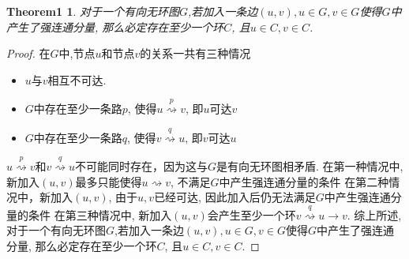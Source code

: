 \documentclass{article}
\newtheorem{theorem}{Theorem1}
\begin{document}
\begin{theorem}
    对于一个有向无环图$G$,若加入一条边$(u,v), u \in G, v \in G$使得$G$中产生了强连通分量, 那么必定存在至少一个环$C$, 且$u \in C, v \in C$.
\end{theorem}
\begin{proof} 
    在$G$中,节点$u$和节点$v$的关系一共有三种情况
    \begin{center}
        \begin{itemize}
            \item $u$与$v$相互不可达.
            \item $G$中存在至少一条路$p$, 使得$u \stackrel{p}{\rightsquigarrow} v$, 即$u$可达$v$
            \item $G$中存在至少一条路$q$, 使得$v \stackrel{q}{\rightsquigarrow} u$, 即$v$可达$u$
        \end{itemize}
    \end{center}
    $u \stackrel{p}{\rightsquigarrow} v$和$v \stackrel{q}{\rightsquigarrow} u$不可能同时存在，因为这与$G$是有向无环图相矛盾.
    在第一种情况中, 新加入$(u,v)$最多只能使得$u \rightsquigarrow v$, 不满足$G$中产生强连通分量的条件
    在第二种情况中，新加入$(u,v)$, 由于$u, v$已经可达, 因此加入后仍无法满足$G$中产生强连通分量的条件
    在第三种情况中, 新加入$(u,v)$会产生至少一个环$v \stackrel{q}{\rightsquigarrow} u \to v$.
    综上所述,对于一个有向无环图$G$,若加入一条边$(u,v), u \in G, v \in G$使得$G$中产生了强连通分量, 那么必定存在至少一个环$C$, 且$u \in C, v \in C$.
\end{proof}
 
\end{document}
